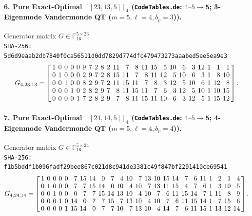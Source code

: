 \documentclass[11pt,a4paper]{article}
\theoremstyle{remark}
\begin{document}
\paragraph{6. Pure Exact-Optimal $[[23,13,5]]_{4}$ (\texttt{CodeTables.de}: $4\text{--}5 \to \mathbf{5}$; 3-Eigenmode Vandermonde QT ($m=5, \ell=4, b_p=3$)).} Generator matrix $G \in \mathbb{F}_{16}^{5 \times 23}$\\
{\footnotesize\texttt{SHA-256: 5d6d9eaab2db7840f0ca56511d0dd7829d774dfc479473273aaabed5ee5ea9e3}}
{\scriptsize\[
G_{4,23,13} = \setlength{\arraycolsep}{1.95pt}\renewcommand{\arraystretch}{0.95}
\left[\begin{array}{*{23}{r}}
1 & 0 & 0 & 0 & 0 & 9 & 7 & 2 & 8 & 2 & 11 & 7 & 8 & 11 & 15 & 5 & 10 & 6 & 3 & 12 & 1 & 1 & 1 \\
0 & 1 & 0 & 0 & 0 & 2 & 9 & 7 & 2 & 8 & 15 & 11 & 7 & 8 & 11 & 12 & 5 & 10 & 6 & 3 & 1 & 8 & 10 \\
0 & 0 & 1 & 0 & 0 & 8 & 2 & 9 & 7 & 2 & 11 & 15 & 11 & 7 & 8 & 3 & 12 & 5 & 10 & 6 & 1 & 12 & 8 \\
0 & 0 & 0 & 1 & 0 & 2 & 8 & 2 & 9 & 7 & 8 & 11 & 15 & 11 & 7 & 6 & 3 & 12 & 5 & 10 & 1 & 10 & 15 \\
0 & 0 & 0 & 0 & 1 & 7 & 2 & 8 & 2 & 9 & 7 & 8 & 11 & 15 & 11 & 10 & 6 & 3 & 12 & 5 & 1 & 15 & 12
\end{array}\right].
\]}

\paragraph{7. Pure Exact-Optimal $[[24,14,5]]_{4}$ (\texttt{CodeTables.de}: $4\text{--}5 \to \mathbf{5}$; 4-Eigenmode Vandermonde QT ($m=5, \ell=4, b_p=4$)).} Generator matrix $G \in \mathbb{F}_{16}^{5 \times 24}$\\
{\footnotesize\texttt{SHA-256: f1b5bddf1b096fadf29bee867c021d8c941de3381c49f847bf2291410ce69541}}
{\scriptsize\[
G_{4,24,14} = \setlength{\arraycolsep}{1.95pt}\renewcommand{\arraystretch}{0.95}
\left[\begin{array}{*{24}{r}}
1 & 0 & 0 & 0 & 0 & 7 & 15 & 14 & 0 & 7 & 4 & 10 & 7 & 13 & 10 & 15 & 14 & 7 & 6 & 11 & 1 & 2 & 1 & 4 \\
0 & 1 & 0 & 0 & 0 & 7 & 7 & 15 & 14 & 0 & 10 & 4 & 10 & 7 & 13 & 11 & 15 & 14 & 7 & 6 & 1 & 3 & 10 & 5 \\
0 & 0 & 1 & 0 & 0 & 0 & 7 & 7 & 15 & 14 & 13 & 10 & 4 & 10 & 7 & 6 & 11 & 15 & 14 & 7 & 1 & 11 & 8 & 9 \\
0 & 0 & 0 & 1 & 0 & 14 & 0 & 7 & 7 & 15 & 7 & 13 & 10 & 4 & 10 & 7 & 6 & 11 & 15 & 14 & 1 & 7 & 15 & 6 \\
0 & 0 & 0 & 0 & 1 & 15 & 14 & 0 & 7 & 7 & 10 & 7 & 13 & 10 & 4 & 14 & 7 & 6 & 11 & 15 & 1 & 13 & 12 & 14
\end{array}\right].
\]}
\end{document}
